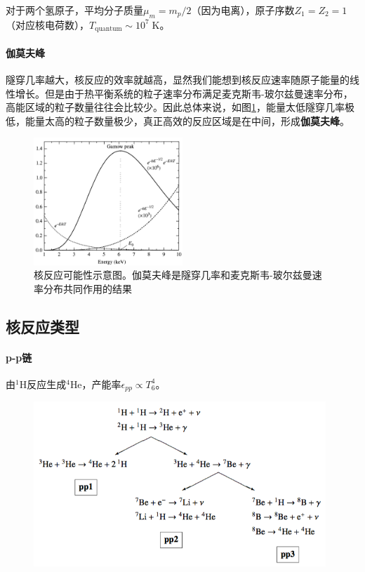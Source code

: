 对于两个氢原子，平均分子质量$\mu_m=m_p/2$（因为电离），原子序数$Z_1=Z_2=1$（对应核电荷数），$T_\mathrm{quantum}\sim10^7\;\mathrm K$。

\paragraph{伽莫夫峰}
隧穿几率越大，核反应的效率就越高，显然我们能想到核反应速率随原子能量的线性增长。但是由于热平衡系统的粒子速率分布满足麦克斯韦-玻尔兹曼速率分布，高能区域的粒子数量往往会比较少。因此总体来说，如图\ref{fig:gamow}，能量太低隧穿几率极低，能量太高的粒子数量极少，真正高效的反应区域是在中间，形成\textbf{伽莫夫峰}。

\begin{figure}[hbt]
  \centering
  \includegraphics[width=5.6cm]{chapters/10/gamowpeak}
  \caption{核反应可能性示意图。伽莫夫峰是隧穿几率和麦克斯韦-玻尔兹曼速率分布共同作用的结果}
  \label{fig:gamow}
\end{figure}

\newpage
\subsection{核反应类型}
\paragraph{p-p链}
由$^1$H反应生成$^4$He，产能率$\epsilon_{pp}\propto T_6^4$。
\begin{figure}[hbt]
  \centering
  \includegraphics[width=11cm]{chapters/10/ppchains}
  \label{}
\end{figure}


